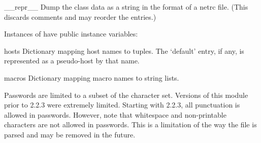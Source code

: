\begin{methoddesc}{__repr__}{}
Dump the class data as a string in the format of a netrc file.
(This discards comments and may reorder the entries.)
\end{methoddesc}

Instances of  have public instance variables:

\begin{memberdesc}{hosts}
Dictionary mapping host names to  tuples.  The `default' entry, if any, is represented
as a pseudo-host by that name.
\end{memberdesc}

\begin{memberdesc}{macros}
Dictionary mapping macro names to string lists.
\end{memberdesc}

\begin{notice}
  Passwords are limited to a subset of the \ASCII{} character set.
  Versions of this module prior to 2.2.3 were extremely limited.
  Starting with 2.2.3, all \ASCII{} punctuation is allowed in
  passwords.  However, note that whitespace and non-printable
  characters are not allowed in passwords.  This is a limitation of
  the way the  file is parsed and may be removed in the
  future.
\end{notice}
